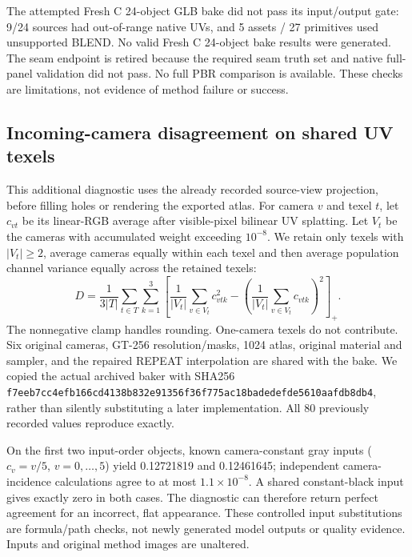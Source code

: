 \documentclass[11pt]{article}
\begin{document}
The attempted Fresh C 24-object GLB bake did not pass its input/output gate: 9/24 sources had out-of-range native UVs, and 5 assets / 27 primitives used unsupported BLEND. No valid Fresh C 24-object bake results were generated. The seam endpoint is retired because the required seam truth set and native full-panel validation did not pass. No full PBR comparison is available. These checks are limitations, not evidence of method failure or success.

\FloatBarrier
\subsection*{Incoming-camera disagreement on shared UV texels}
This additional diagnostic uses the already recorded source-view projection, before filling holes or rendering the exported atlas. For camera $v$ and texel $t$, let $c_{vt}$ be its linear-RGB average after visible-pixel bilinear UV splatting. Let $V_t$ be the cameras with accumulated weight exceeding $10^{-8}$. We retain only texels with $|V_t|\geq2$, average cameras equally within each texel and then average population channel variance equally across the retained texels:
\[
D=\frac{1}{3|T|}\sum_{t\in T}\sum_{k=1}^3\left[\frac{1}{|V_t|}\sum_{v\in V_t}c_{vtk}^{2}-\left(\frac{1}{|V_t|}\sum_{v\in V_t}c_{vtk}\right)^2\right]_+ .
\]
The nonnegative clamp handles rounding. One-camera texels do not contribute. Six original cameras, GT-256 resolution/masks, 1024 atlas, original material and sampler, and the repaired REPEAT interpolation are shared with the bake. We copied the actual archived baker with SHA256 \texttt{f7eeb7cc4efb166cd4138b832e91356f36f775ac18badedefde5610aafdb8db4}, rather than silently substituting a later implementation. All 80 previously recorded values reproduce exactly.

On the first two input-order objects, known camera-constant gray inputs ($c_v=v/5$, $v=0,\ldots,5$) yield 0.12721819 and 0.12461645; independent camera-incidence calculations agree to at most $1.1\times10^{-8}$. A shared constant-black input gives exactly zero in both cases. The diagnostic can therefore return perfect agreement for an incorrect, flat appearance. These controlled input substitutions are formula/path checks, not newly generated model outputs or quality evidence. Inputs and original method images are unaltered.
\end{document}
